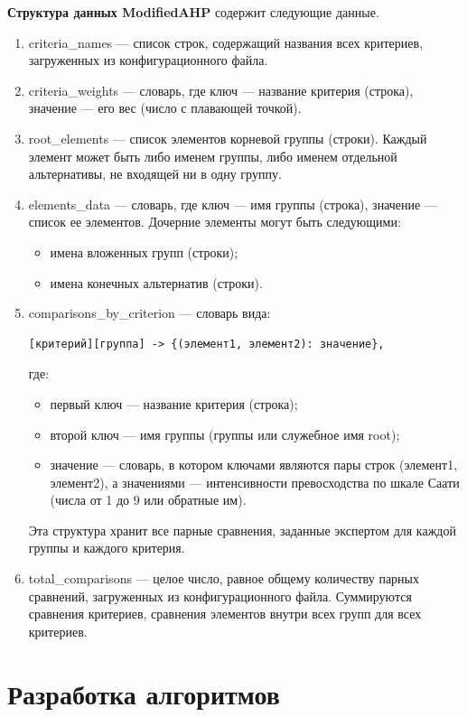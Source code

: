 \clearpage
\textbf{Структура данных ModifiedAHP} содержит следующие данные.
\begin{enumerate}
\item criteria\_names --- список строк, содержащий названия всех критериев, загруженных из конфигурационного файла.

\item criteria\_weights --- словарь, где ключ --- название критерия (строка), значение --- его вес (число с плавающей точкой).

\item root\_elements --- список элементов корневой группы (строки). 
Каждый элемент может быть либо именем группы, либо именем отдельной альтернативы, не входящей ни в одну группу. 
\item elements\_data --- словарь, где ключ --- имя группы (строка), значение --- список ее элементов. 
Дочерние элементы могут быть следующими:
\begin{itemize}
\item имена вложенных групп (строки);
\item имена конечных альтернатив (строки).
\end{itemize}

\item comparisons\_by\_criterion --- словарь вида:
\begin{verbatim}
[критерий][группа] -> {(элемент1, элемент2): значение},
\end{verbatim}
где:
\begin{itemize}
\item первый ключ --- название критерия (строка);
\item второй ключ --- имя группы (группы или служебное имя root);
\item значение --- словарь, в котором ключами являются пары строк (элемент1, элемент2), а значениями — интенсивности превосходства по шкале Саати (числа от 1 до 9 или обратные им).
\end{itemize}
Эта структура хранит все парные сравнения, заданные экспертом для каждой группы и каждого критерия.

\item total\_comparisons --- целое число, равное общему количеству парных сравнений, загруженных из конфигурационного файла. Суммируются сравнения критериев, сравнения элементов внутри всех групп для всех критериев.
\end{enumerate}
\section{Разработка алгоритмов}
